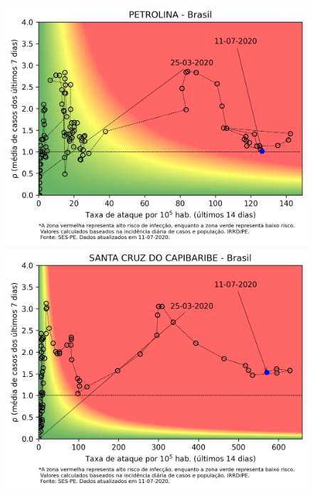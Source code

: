 \documentclass[]{article}
\begin{document}
\newpage
\begin{figure}[!h]
	\centering
	\begin{minipage}[t]{4cm}
		\centering
		\includegraphics[scale=0.5]{../PETROLINA.png}
	\end{minipage}
	\hspace{5cm}
	\begin{minipage}[t]{4cm}
		\centering
		\includegraphics[scale=0.5]{../SANTA CRUZ DO CAPIBARIBE.png}
		\vspace{0.2cm}
	\end{minipage}
	

\end{figure}
\end{document}
